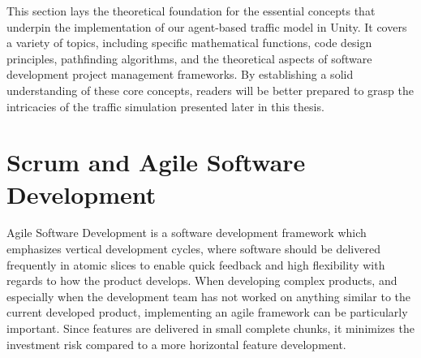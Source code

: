 
This section lays the theoretical foundation for the essential concepts that underpin the implementation of our agent-based traffic model in Unity. It covers a variety of topics, including specific mathematical functions, code design principles, pathfinding algorithms, and the theoretical aspects of software development project management frameworks. By establishing a solid understanding of these core concepts, readers will be better prepared to grasp the intricacies of the traffic simulation presented later in this thesis.









\section{Scrum and Agile Software Development}
    Agile Software Development is a software development framework which emphasizes vertical development cycles, where software should be delivered frequently in atomic slices to enable quick feedback and high flexibility with regards to how the product develops. When developing complex products, and especially when the development team has not worked on anything similar to the current developed product, implementing an agile framework can be particularly important. Since features are delivered in small complete chunks, it minimizes the investment risk compared to a more horizontal feature development.






